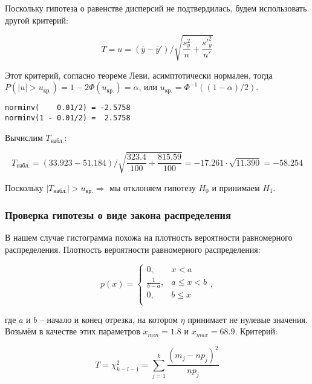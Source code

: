 \documentclass{report}
\renewcommand {\le} {\leqslant}
\begin{document}
Поскольку гипотеза о равенстве дисперсий не подтвердилась, будем использовать другой критерий:

\begin{equation}
T = u = \left(\bar y - \bar y' \right) / \sqrt{\frac{s^2_y}{n} + \frac{s'^2_y}{n'}}
\end{equation}

Этот критерий, согласно теореме Леви, асимптотически нормален, тогда $P\left(|u| > u_\text{кр.}\right) = 1 - 2\Phi\left(u_\text{кр.}\right) = \alpha$, или $u_\text{кр.} = \Phi^{-1}\left(\left(1 - \alpha\right) / 2\right)$.

\begin{lstlisting}
norminv(    0.01/2) = -2.5758
norminv(1 - 0.01/2) =  2.5758
\end{lstlisting}

Вычислим $T_\text{набл.}$:

\begin{equation}
T_\text{набл.} = (33.923 - 51.184) / \sqrt{\frac{323.4}{100} + \frac{815.59}{100}} = -17.261 \cdot \sqrt{11.390} = -58.254
\end{equation}

Поскольку $|T_\text{набл.}| > u_\text{кр.} \Rightarrow$ мы отклоняем гипотезу $H_0$ и принимаем $H_1$.

\newpage

\subsubsection*{Проверка гипотезы о виде закона распределения}

В нашем случае гистограмма похожа на плотность вероятности равномерного распределения. Плотность вероятности равномерного распределения:

\begin{equation*}
p(x) = 
\begin {cases}
0,               & x < a \\
\frac{1}{b - a}, & a \le x < b \\
0,               & b \le x \\
\end {cases},
\end{equation*}

где $a$ и $b$ -- начало и конец отрезка, на котором $\eta$ принимает не нулевые значения. Возьмём в качестве этих параметров $x_{min} = 1.8$ и $x_{max} = 68.9$. Критерий:

\begin{equation}
T = \chi^2_{k-l-1} = \sum \limits_{j=1}^{k} \frac{\left(m_j - np_j\right)^2}{np_j}
\end{equation}
\end{document}
